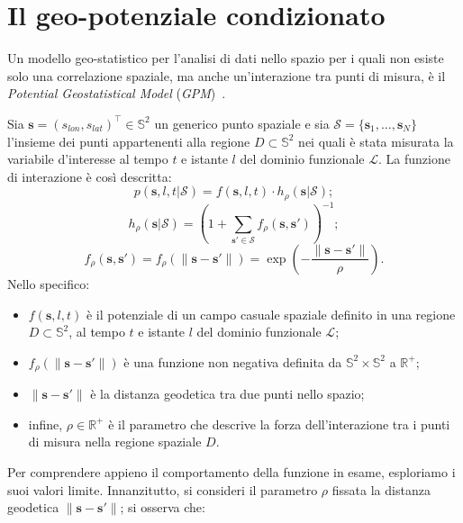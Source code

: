 \section[Il geo-potenziale condizionato]{Il geo-potenziale condizionato}
Un modello geo-statistico per l'analisi di dati nello spazio per i quali non esiste solo una correlazione spaziale, ma anche un'interazione tra punti di misura, è il \textit{Potential Geostatistical Model} (\textit{GPM})~\citep{paper_GPM}.
\par Sia $\mathbf{s} = (s_{lon}, s_{lat})^\top\in\mathbb{S}^2$ un generico punto spaziale e sia $\mathcal{S} = \{\mathbf{s}_1, \ldots, \mathbf{s}_ N\}$ l'insieme dei punti appartenenti alla regione $D\subset\mathbb{S}^2$ nei quali è stata misurata la variabile d'interesse al tempo $t$ e istante $l$ del dominio funzionale $\mathcal{L}$. La funzione di interazione è così descritta:
\begin{equation}
	p(\mathbf{s}, l, t| \mathcal{S}) = f(\mathbf{s}, l, t) \cdot h_\rho(\mathbf{s}| \mathcal{S});
	\label{funzione di interazione}
\end{equation}
\begin{equation}
	h_\rho(\mathbf{s}|\mathcal{S}) = \left(1 + \sum_{\mathbf{s}' \in \mathcal{S}} f_\rho(\mathbf{s}, \mathbf{s}')\right)^{-1};
	\label{funzione di interazione_2}
\end{equation}
\begin{equation}
	f_\rho(\mathbf{s}, \mathbf{s}') = f_\rho(\|\mathbf{s} - \mathbf{s}'\|) = \exp\left(-\frac{{\|\mathbf{s} - \mathbf{s}'\|}}{{\rho}}\right).
	\label{nonnegative binary function}
\end{equation}
Nello specifico:
\begin{itemize}
	\item $f(\mathbf{s}, l, t)$ è il potenziale di un campo casuale spaziale definito in una regione  $D \subset \mathbb{S}^2$, al tempo $t$ e istante $l$ del dominio funzionale $\mathcal{L}$;
	\item $f_\rho(\|\mathbf{s} - \mathbf{s}'\|)$ è una funzione non negativa definita da $\mathbb{S}^2\times\mathbb{S}^2$ a $\mathbb{R}^+$;
	\item $\|\mathbf{s} - \mathbf{s}'\|$ è la distanza geodetica tra due punti nello spazio;
	\item infine, $\rho \in \mathbb{R}^+$ è il parametro che descrive la forza dell'interazione tra i punti di misura nella regione spaziale $D$.
\end{itemize}
Per comprendere appieno il comportamento della funzione in esame, esploriamo i suoi valori limite. Innanzitutto, si consideri il parametro $\rho$ fissata la distanza geodetica $\|\mathbf{s} - \mathbf{s}'\|$; si osserva che:
